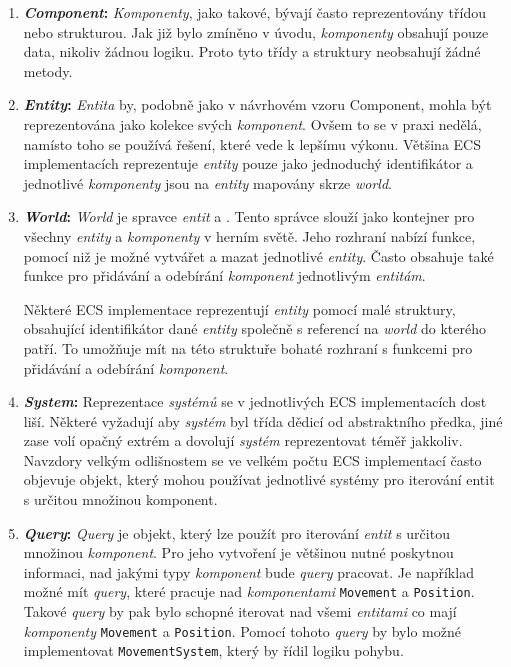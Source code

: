 \begin{enumerate}
    \item \textbf{\textit{Component}:} \textit{Komponenty}, jako takové, bývají často reprezentovány třídou nebo strukturou. Jak již bylo zmíněno v úvodu, \textit{komponenty} obsahují pouze data, nikoliv žádnou logiku. Proto tyto třídy a struktury neobsahují žádné metody.

    \item \textbf{\textit{Entity}:} \textit{Entita} by, podobně jako v návrhovém vzoru Component, mohla být reprezentována jako kolekce svých \textit{komponent}. Ovšem to se v praxi nedělá, namísto toho se používá řešení, které vede k lepšímu výkonu. Většina ECS implementacích reprezentuje \textit{entity} pouze jako jednoduchý identifikátor a jednotlivé \textit{komponenty} jsou na \textit{entity} mapovány skrze \textit{world}.

    \item \textbf{\textit{World}:} \textit{World} je spravce \textit{entit} a . Tento správce slouží jako kontejner pro všechny \textit{entity} a \textit{komponenty} v herním světě. Jeho rozhraní nabízí funkce, pomocí niž je možné vytvářet a mazat jednotlivé \textit{entity}. Často obsahuje také funkce pro přidávání a odebírání \textit{komponent} jednotlivým \textit{entitám}.

    Některé ECS implementace reprezentují \textit{entity} pomocí malé struktury, obsahující identifikátor dané \textit{entity} společně s referencí na \textit{world} do kterého patří. To umožňuje mít na této struktuře bohaté rozhraní s funkcemi pro přidávání a odebírání \textit{komponent}.

    \item \textbf{\textit{System}:} Reprezentace \textit{systémů} se v jednotlivých ECS implementacích dost liší. Některé vyžadují aby \textit{systém} byl třída dědicí od abstraktního předka, jiné zase volí opačný extrém a dovolují \textit{systém} reprezentovat téměř jakkoliv. Navzdory velkým odlišnostem se ve velkém počtu ECS implementací často objevuje objekt, který mohou používat jednotlivé systémy pro iterování entit s určitou množinou komponent.

    \item \textbf{\textit{Query}:} \textit{Query} je objekt, který lze použít pro iterování \textit{entit} s určitou množinou \textit{komponent}. Pro jeho vytvoření je většinou nutné poskytnou informaci, nad jakými typy \textit{komponent} bude \textit{query} pracovat. Je například možné mít \textit{query}, které pracuje nad \textit{komponentami} \verb|Movement| a \verb|Position|. Takové \textit{query} by pak bylo schopné iterovat nad všemi \textit{entitami} co mají \textit{komponenty} \verb|Movement| a \verb|Position|. Pomocí tohoto \textit{query} by bylo možné implementovat \verb|MovementSystem|, který by řídil logiku pohybu.
\end{enumerate}

